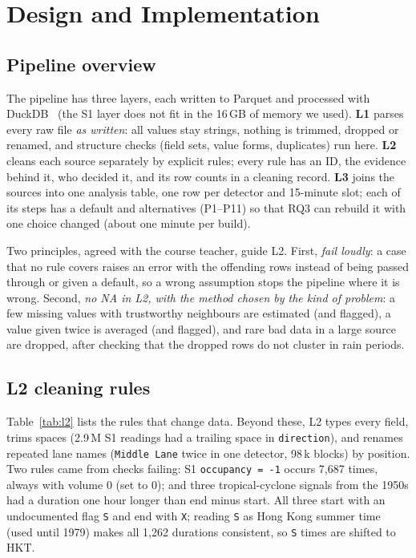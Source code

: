 \documentclass[conference]{IEEEtran}
\begin{document}
\section{Design and Implementation}
\subsection{Pipeline overview}
The pipeline has three layers, each written to Parquet and processed with
DuckDB~\cite{raasveldt2019duckdb} (the S1 layer does not fit in the 16\,GB of memory we used).
\textbf{L1} parses every raw file \emph{as written}: all values stay strings, nothing is
trimmed, dropped or renamed, and structure checks (field sets, value forms, duplicates) run
here. \textbf{L2} cleans each source separately by explicit rules; every rule has an ID, the
evidence behind it, who decided it, and its row counts in a cleaning record. \textbf{L3} joins
the sources into one analysis table, one row per detector and 15-minute slot; each of its
steps has a default and alternatives (P1--P11) so that RQ3 can rebuild it with one choice
changed (about one minute per build).

Two principles, agreed with the course teacher, guide L2. First, \emph{fail loudly}: a case
that no rule covers raises an error with the offending rows instead of being passed through
or given a default, so a wrong assumption stops the pipeline where it is wrong. Second,
\emph{no NA in L2, with the method chosen by the kind of problem}: a few missing values with
trustworthy neighbours are estimated (and flagged), a value given twice is averaged (and
flagged), and rare bad data in a large source are dropped, after checking that the dropped
rows do not cluster in rain periods.

\subsection{L2 cleaning rules}
Table~\ref{tab:l2} lists the rules that change data. Beyond these, L2 types every field,
trims spaces (2.9\,M S1 readings had a trailing space in \texttt{direction}), and renames
repeated lane names (\texttt{Middle Lane} twice in one detector, 98\,k blocks) by position.
Two rules came from checks failing: S1 \texttt{occupancy = -1} occurs 7,687 times, always with
volume 0 (set to 0); and three tropical-cyclone signals from the 1950s had a duration one hour
longer than end minus start. All three start with an undocumented flag \texttt{S} and end with
\texttt{X}; reading \texttt{S} as Hong Kong summer time (used until 1979) makes all 1,262
durations consistent, so \texttt{S} times are shifted to HKT.
\end{document}
